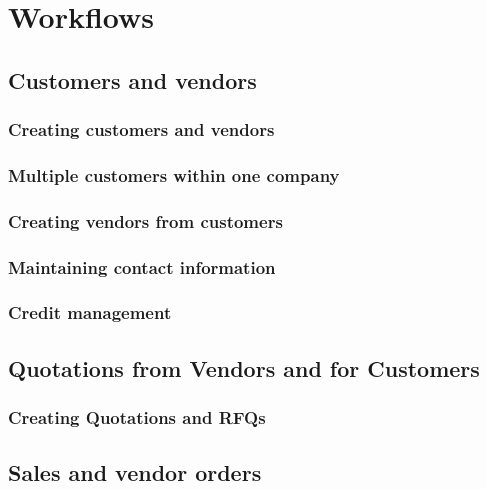 

\part{Workflows}
\label{part:Workflows}

\chapter{Customers and vendors}

\section{Creating customers and vendors}

\section{Multiple customers within one company}

\section{Creating vendors from customers}

\section{}

\section{Maintaining contact information}

\section{Credit management}


\chapter{Quotations from Vendors and for Customers}

\section{Creating Quotations and RFQs}

\chapter{Sales and vendor orders}

